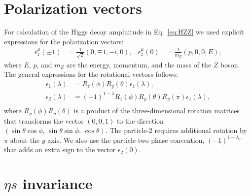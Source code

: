 \documentclass[prd,preprintnumbers,floatfix,
nofootinbib,superscriptaddress]{revtex4}
\begin{document}
\appendix

\section{Polarization vectors}

For calculation of the Higgs decay ampluitude in Eq.~\eqref{eq:HZZ}
we used explicit expressions for the polarization vectors:
\begin{align}
  \epsilon_z^{\mu}(\pm1) &= \frac{1}{\sqrt{2}} \left( 0,\mp 1,-i,0 \right), &
  \epsilon_z^{\mu}(0) &= \frac{1}{m_Z} \left(p,0,0,E\right),
\end{align}
where $E$, $p$, and $m_Z$ are the energy, momentum, and the mass of the $Z$ boson.
The general expressions for the rotational vectors follows:
\begin{align}
  \epsilon_1(\lambda) &= R_z(\phi) R_y(\theta) \epsilon_z(\lambda),\\
  \epsilon_2(\lambda) &= (-1)^{1-\lambda} R_z(\phi) R_y(\theta) R_y(\pi) \epsilon_z(\lambda),\\
\end{align}
where $R_y(\phi)R_y(\theta)$ is a product of the three-dimensional rotation matrices
that transforms the vector $(0,0,1)$ to the direction $(\sin\theta\cos\phi,\,\sin\theta\sin\phi,\,\cos\theta)$.
The particle-2 requires additional rotation by $\pi$ about the $y$ axis. We also use the particle-two phase convention,
$(-1)^{1-\lambda_2}$ that adds an extra sign to the vector $\epsilon_2(0)$.

\section{$\eta s$ invariance}
\end{document}

